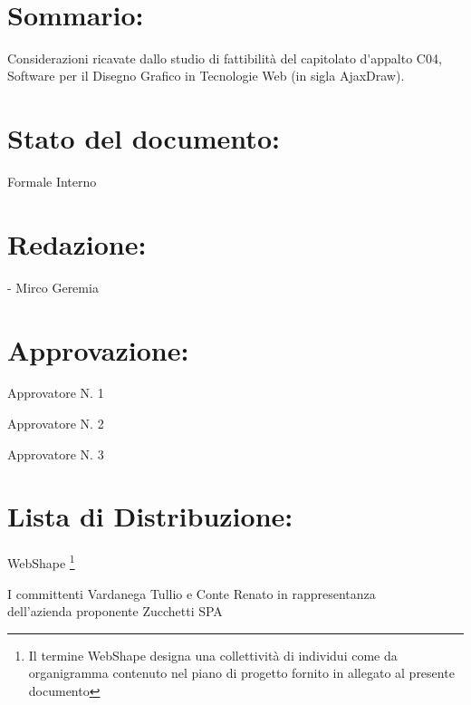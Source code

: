 \begin{center} %
	\begin{Huge}	
				\textbf{\TITOLODOC}
			\\
	\end{Huge}
\end{center}

\section*{\Large Sommario:} %
\indent \indent
Considerazioni ricavate dallo studio di fattibilit\`{a} del capitolato d\'{}appalto C04, 
Software per il Disegno Grafico in Tecnologie Web (in sigla AjaxDraw).


\section*{\Large Stato del documento:}
\indent \indent
	Formale Interno

\section*{\Large Redazione:}
	\begin{elencopuntato}[\normindent]
		\item[-] Mirco Geremia
	
	\end{elencopuntato}

\section*{\Large Approvazione:}
	\begin{elencopuntato}[\normindent]
		\item Approvatore N. 1
		\item Approvatore N. 2
		\item Approvatore N. 3
	\end{elencopuntato}

\section*{\LARGE Lista di Distribuzione:}

	\begin{elenconumerato}{\normindent}
		\item WebShape \footnote{Il termine WebShape designa una collettivit\`a di individui come da organigramma contenuto nel piano di progetto fornito in allegato al presente documento}
		\item I committenti Vardanega Tullio e Conte Renato in rappresentanza \\  dell'azienda proponente Zucchetti SPA
	\end{elenconumerato}

